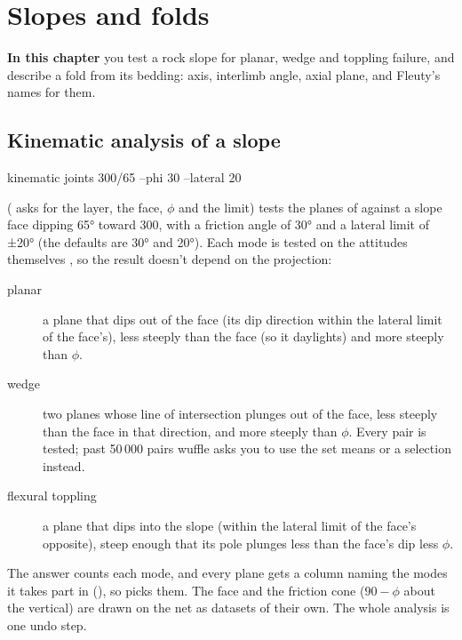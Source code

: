 \chapter{Slopes and folds}\label{ch:slopes-folds}
\begin{goals}
\textbf{In this chapter} you test a rock slope for planar, wedge and toppling failure, and describe a fold
from its bedding: axis, interlimb angle, axial plane, and Fleuty's names for them.
\end{goals}

\section{Kinematic analysis of a slope}\label{sec:kinematic}

\begin{center}\small\ttfamily
kinematic joints 300/65 --phi 30 --lateral 20
\end{center}

\noindent ( asks for the layer, the face, $\phi$ and the
limit) tests the planes of  against a slope face dipping 65° toward 300, with a friction
angle of 30° and a lateral limit of ±20° (the defaults are 30° and 20°). Each mode is tested on the
attitudes themselves \parencite{markland1972,hoek1981,goodman1976}, so the result doesn't depend on the
projection:

\begin{description}
\item[planar] a plane that dips out of the face (its dip direction within the lateral limit of the
face's), less steeply than the face (so it daylights) and more steeply than $\phi$.
\item[wedge] two planes whose line of intersection plunges out of the face, less steeply than the face
in that direction, and more steeply than $\phi$. Every pair is tested; past 50\,000 pairs wuffle asks you to
use the set means or a selection instead.
\item[flexural toppling] a plane that dips into the slope (within the lateral limit of the face's
opposite), steep enough that its pole plunges less than the face's dip less $\phi$.
\end{description}

The answer counts each mode, and every plane gets a  column naming the modes it takes part
in (), so  picks them. The face
and the friction cone ($90 - \phi$ about the vertical) are drawn on the net as datasets of their own. The
whole analysis is one undo step.

